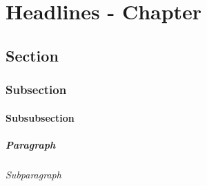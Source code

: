 \chapter{Headlines - Chapter}

\blindtext

\section{Section}

\blindtext

\subsection{Subsection}

\blindtext

\subsubsection{Subsubsection}

\blindtext

\paragraph{Paragraph}

\blindtext

\subparagraph{Subparagraph}

\blindtext
